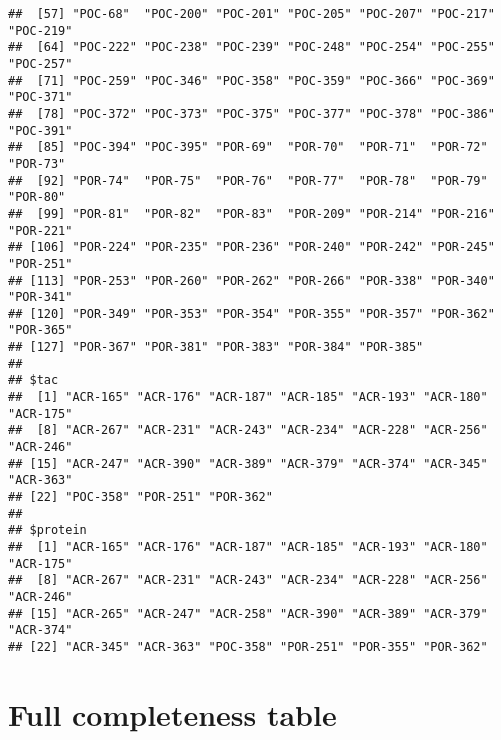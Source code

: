 \documentclass[]{article}
\newenvironment{Shaded}{\begin{snugshade}}{\end{snugshade}}
\newcommand{\KeywordTok}[1]{\textcolor[rgb]{0.13,0.29,0.53}{\textbf{#1}}}
\newcommand{\DataTypeTok}[1]{\textcolor[rgb]{0.13,0.29,0.53}{#1}}
\newcommand{\StringTok}[1]{\textcolor[rgb]{0.31,0.60,0.02}{#1}}
\newcommand{\OperatorTok}[1]{\textcolor[rgb]{0.81,0.36,0.00}{\textbf{#1}}}
\newcommand{\NormalTok}[1]{#1}
\begin{document}
\begin{verbatim}
##  [57] "POC-68"  "POC-200" "POC-201" "POC-205" "POC-207" "POC-217" "POC-219"
##  [64] "POC-222" "POC-238" "POC-239" "POC-248" "POC-254" "POC-255" "POC-257"
##  [71] "POC-259" "POC-346" "POC-358" "POC-359" "POC-366" "POC-369" "POC-371"
##  [78] "POC-372" "POC-373" "POC-375" "POC-377" "POC-378" "POC-386" "POC-391"
##  [85] "POC-394" "POC-395" "POR-69"  "POR-70"  "POR-71"  "POR-72"  "POR-73" 
##  [92] "POR-74"  "POR-75"  "POR-76"  "POR-77"  "POR-78"  "POR-79"  "POR-80" 
##  [99] "POR-81"  "POR-82"  "POR-83"  "POR-209" "POR-214" "POR-216" "POR-221"
## [106] "POR-224" "POR-235" "POR-236" "POR-240" "POR-242" "POR-245" "POR-251"
## [113] "POR-253" "POR-260" "POR-262" "POR-266" "POR-338" "POR-340" "POR-341"
## [120] "POR-349" "POR-353" "POR-354" "POR-355" "POR-357" "POR-362" "POR-365"
## [127] "POR-367" "POR-381" "POR-383" "POR-384" "POR-385"
## 
## $tac
##  [1] "ACR-165" "ACR-176" "ACR-187" "ACR-185" "ACR-193" "ACR-180" "ACR-175"
##  [8] "ACR-267" "ACR-231" "ACR-243" "ACR-234" "ACR-228" "ACR-256" "ACR-246"
## [15] "ACR-247" "ACR-390" "ACR-389" "ACR-379" "ACR-374" "ACR-345" "ACR-363"
## [22] "POC-358" "POR-251" "POR-362"
## 
## $protein
##  [1] "ACR-165" "ACR-176" "ACR-187" "ACR-185" "ACR-193" "ACR-180" "ACR-175"
##  [8] "ACR-267" "ACR-231" "ACR-243" "ACR-234" "ACR-228" "ACR-256" "ACR-246"
## [15] "ACR-265" "ACR-247" "ACR-258" "ACR-390" "ACR-389" "ACR-379" "ACR-374"
## [22] "ACR-345" "ACR-363" "POC-358" "POR-251" "POR-355" "POR-362"
\end{verbatim}

\section{Full completeness table}\label{full-completeness-table}

\begin{Shaded}
\end{Shaded}
\end{document}
